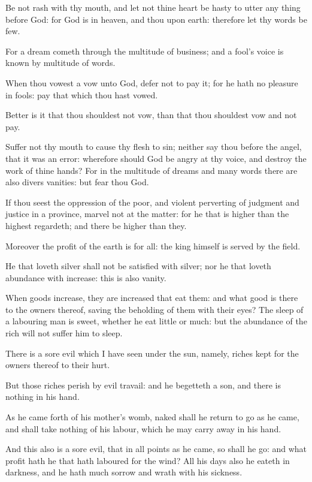 \Verse Be not rash with thy mouth, and let not thine heart be hasty to utter any thing before God: for God is in heaven, and thou upon earth: therefore let thy words be few.

\Verse For a dream cometh through the multitude of business; and a fool's voice is known by multitude of words.

\Verse When thou vowest a vow unto God, defer not to pay it; for he hath no pleasure in fools: pay that which thou hast vowed.

\Verse Better is it that thou shouldest not vow, than that thou shouldest vow and not pay.

\Verse Suffer not thy mouth to cause thy flesh to sin; neither say thou before the angel, that it was an error: wherefore should God be angry at thy voice, and destroy the work of thine hands?  \Verse For in the multitude of dreams and many words there are also divers vanities: but fear thou God.

\Verse If thou seest the oppression of the poor, and violent perverting of judgment and justice in a province, marvel not at the matter: for he that is higher than the highest regardeth; and there be higher than they.

\Verse Moreover the profit of the earth is for all: the king himself is served by the field.

\Verse He that loveth silver shall not be satisfied with silver; nor he that loveth abundance with increase: this is also vanity.

\Verse When goods increase, they are increased that eat them: and what good is there to the owners thereof, saving the beholding of them with their eyes?  \Verse The sleep of a labouring man is sweet, whether he eat little or much: but the abundance of the rich will not suffer him to sleep.

\Verse There is a sore evil which I have seen under the sun, namely, riches kept for the owners thereof to their hurt.

\Verse But those riches perish by evil travail: and he begetteth a son, and there is nothing in his hand.

\Verse As he came forth of his mother's womb, naked shall he return to go as he came, and shall take nothing of his labour, which he may carry away in his hand.

\Verse And this also is a sore evil, that in all points as he came, so shall he go: and what profit hath he that hath laboured for the wind?  \Verse All his days also he eateth in darkness, and he hath much sorrow and wrath with his sickness.

